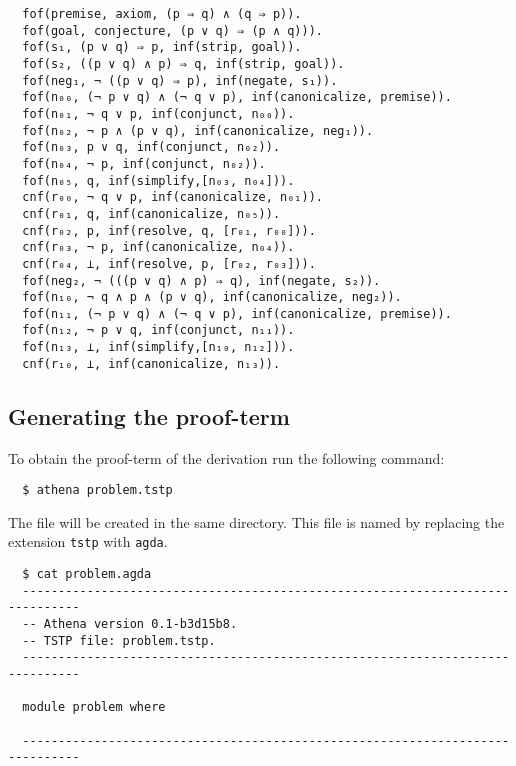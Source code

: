 \documentclass[../main.tex]{subfiles}
\begin{document}
\begin{subappendices}
\begin{verbatim}
  fof(premise, axiom, (p ⇒ q) ∧ (q ⇒ p)).
  fof(goal, conjecture, (p ∨ q) ⇒ (p ∧ q))).
  fof(s₁, (p ∨ q) ⇒ p, inf(strip, goal)).
  fof(s₂, ((p ∨ q) ∧ p) ⇒ q, inf(strip, goal)).
  fof(neg₁, ¬ ((p ∨ q) ⇒ p), inf(negate, s₁)).
  fof(n₀₀, (¬ p ∨ q) ∧ (¬ q ∨ p), inf(canonicalize, premise)).
  fof(n₀₁, ¬ q ∨ p, inf(conjunct, n₀₀)).
  fof(n₀₂, ¬ p ∧ (p ∨ q), inf(canonicalize, neg₁)).
  fof(n₀₃, p ∨ q, inf(conjunct, n₀₂)).
  fof(n₀₄, ¬ p, inf(conjunct, n₀₂)).
  fof(n₀₅, q, inf(simplify,[n₀₃, n₀₄])).
  cnf(r₀₀, ¬ q ∨ p, inf(canonicalize, n₀₁)).
  cnf(r₀₁, q, inf(canonicalize, n₀₅)).
  cnf(r₀₂, p, inf(resolve, q, [r₀₁, r₀₀])).
  cnf(r₀₃, ¬ p, inf(canonicalize, n₀₄)).
  cnf(r₀₄, ⊥, inf(resolve, p, [r₀₂, r₀₃])).
  fof(neg₂, ¬ (((p ∨ q) ∧ p) ⇒ q), inf(negate, s₂)).
  fof(n₁₀, ¬ q ∧ p ∧ (p ∨ q), inf(canonicalize, neg₂)).
  fof(n₁₁, (¬ p ∨ q) ∧ (¬ q ∨ p), inf(canonicalize, premise)).
  fof(n₁₂, ¬ p ∨ q, inf(conjunct, n₁₁)).
  fof(n₁₃, ⊥, inf(simplify,[n₁₀, n₁₂])).
  cnf(r₁₀, ⊥, inf(canonicalize, n₁₃)).
\end{verbatim}

\subsection{Generating the \Agda proof-term}

To obtain the \Agda proof-term of the \Metis derivation run
the following command:

\begin{verbatim}
  $ athena problem.tstp
\end{verbatim}

The \Agda file will be created in the same directory. This
file is named by replacing the extension \verb!tstp! with \verb!agda!.

\begin{verbatim}
  $ cat problem.agda
  ------------------------------------------------------------------------------
  -- Athena version 0.1-b3d15b8.
  -- TSTP file: problem.tstp.
  ------------------------------------------------------------------------------

  module problem where

  ------------------------------------------------------------------------------


\end{verbatim}
\end{subappendices}
\end{document}
